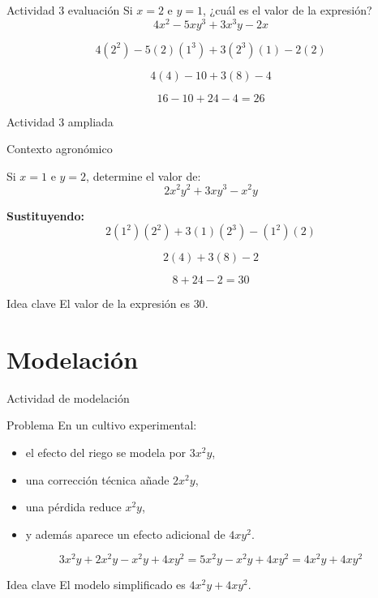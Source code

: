 \documentclass[handout,aspectratio=169,12pt]{beamer}
\newcommand{\IdeaClave}[1]{
	\begin{alertblock}{Idea clave}
		#1
	\end{alertblock}
}
\newcommand{\Agronomia}[1]{
	\begin{exampleblock}{Contexto agronómico}
		#1
	\end{exampleblock}
}
\begin{document}
	\begin{frame}{Actividad 3 evaluación}
		Si \(x=2\) e \(y=1\), ¿cuál es el valor de la expresión?
		\[
		4x^2 - 5xy^3 + 3x^3y - 2x
		\]
		
		\pause
		\[
		4(2^2) - 5(2)(1^3) + 3(2^3)(1) - 2(2)
		\]
		
		\pause
		\[
		4(4) - 10 + 3(8) - 4
		\]
		
		\pause
		\[
		16 - 10 + 24 - 4 = 26
		\]
	\end{frame}
	
	\begin{frame}{Actividad 3 ampliada}
		\Agronomia{
			Si \(x=1\) e \(y=2\), determine el valor de:
			\[
			2x^2y^2 + 3xy^3 - x^2y
			\]
		}
		
		\pause
		\textbf{Sustituyendo:}
		\[
		2(1^2)(2^2) + 3(1)(2^3) - (1^2)(2)
		\]
		
		\pause
		\[
		2(4) + 3(8) - 2
		\]
		
		\pause
		\[
		8 + 24 - 2 = 30
		\]
		
		\pause
		\IdeaClave{El valor de la expresión es \(30\).}
	\end{frame}
	
	\section{Modelación}
	\begin{frame}{Actividad de modelación}
		\begin{block}{Problema}
			En un cultivo experimental:
			\begin{itemize}
				\item el efecto del riego se modela por \(3x^2y\),
				\pause
				\item una corrección técnica añade \(2x^2y\),
				\pause
				\item una pérdida reduce \(x^2y\),
				\pause
				\item y además aparece un efecto adicional de \(4xy^2\).
			\end{itemize}
		\end{block}
		
		\pause
		\[
		3x^2y + 2x^2y - x^2y + 4xy^2=5x^2y - x^2y + 4xy^2=4x^2y + 4xy^2
		\]
		
		\pause
		\IdeaClave{El modelo simplificado es \(4x^2y + 4xy^2\).}
	\end{frame}
	
\end{document}
